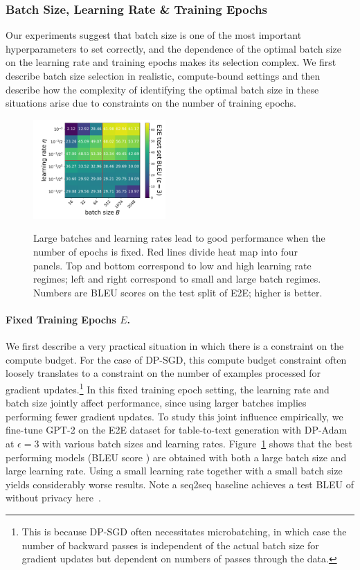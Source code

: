 \subsubsection{Batch Size, Learning Rate \& Training Epochs}
Our experiments suggest that batch size is one of the most important hyperparameters to set correctly, and the dependence of the optimal batch size on the learning rate and training epochs makes its selection complex.
We first describe batch size selection in realistic, compute-bound settings and then describe how the complexity of identifying the optimal batch size in these situations arise due to constraints on the number of training epochs.

\begin{figure}
\centering
\vspace{-2mm}
{\includegraphics[width=0.45\textwidth]{figs/bs_vs_lr_BLEU.pdf}}
\caption{
Large batches and learning rates lead to good performance when the number of epochs is fixed.
Red lines divide heat map into four panels. Top and bottom correspond to low and high learning rate regimes; left and right correspond to small and large batch regimes.
Numbers are BLEU scores on the test split of E2E; higher is better.
}
\label{fig:bs_vs_lr}
\end{figure}
\paragraph{Fixed Training Epochs $E$.}
We first describe a very practical situation in which there is a constraint on the compute budget.
For the case of DP-SGD, this compute budget constraint often loosely translates to a constraint on the number of examples processed for gradient updates.\footnote{This is because DP-SGD often necessitates microbatching, in which case the number of backward passes is independent of the actual batch size for gradient updates but dependent on numbers of passes through the data.} 
In this fixed training epoch setting, the learning rate and batch size jointly affect performance, since using larger batches implies performing fewer gradient updates. 
To study this joint influence empirically, we fine-tune GPT-2 on the E2E dataset for table-to-text generation with DP-Adam at $\epsilon=3$ with various batch sizes and learning rates. 
Figure~\ref{fig:bs_vs_lr} shows that the best performing models (BLEU score )
are obtained with both a large batch size and large learning rate. 
Using a small learning rate together with a small batch size yields considerably worse results. 
Note a seq2seq baseline achieves a test 
BLEU of  without privacy here~\citep{wiseman2018learning}. 

